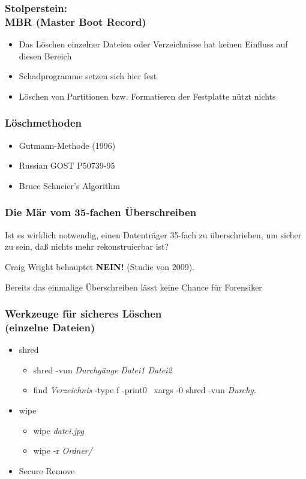 \begin{frame}
  \frametitle{Stolperstein:\\MBR (Master Boot Record)}
  \begin{itemize}
    \item Das Löschen einzelner Dateien oder Verzeichnisse hat keinen Einfluss auf diesen Bereich
    \item Schadprogramme setzen sich hier fest
    \item Löschen von Partitionen bzw. Formatieren der Festplatte nützt nichts
  \end{itemize}
\end{frame}

\begin{frame}
  \frametitle{Löschmethoden}
  \begin{itemize}
    \item Gutmann-Methode (1996)
    \item Russian GOST P50739-95
    \item Bruce Schneier's Algorithm
  \end{itemize}
\end{frame}

\begin{frame}
  \frametitle{Die Mär vom 35-fachen Überschreiben}
  Ist es wirklich notwendig, einen Datenträger 35-fach zu überschrieben, um sicher zu sein, daß nichts mehr rekonstruierbar ist?
  \pause
  \begin{alertblock}{Craig Wright behauptet}
    {\bf NEIN!} (Studie von 2009).
  \end{alertblock}
  \pause
  Bereits das einmalige Überschreiben lässt keine Chance für Forensiker
\end{frame}

\begin{frame}
  \frametitle{Werkzeuge für sicheres Löschen\\(einzelne Dateien)}
  \begin{itemize}
    \item shred
      \begin{itemize}
        \item shred -vun \textit{Durchgänge} \textit{Datei1  Datei2}
        \item find \textit{Verzeichnis} -type f -print0 \textbar ~xargs -0 shred -vun \textit{Durchg.}
      \end{itemize}
    \item wipe
      \begin{itemize}
        \item wipe \textit{datei.jpg}
        \item wipe -r \textit{Ordner/}
      \end{itemize}
    \item Secure Remove
  \end{itemize}
\end{frame}

